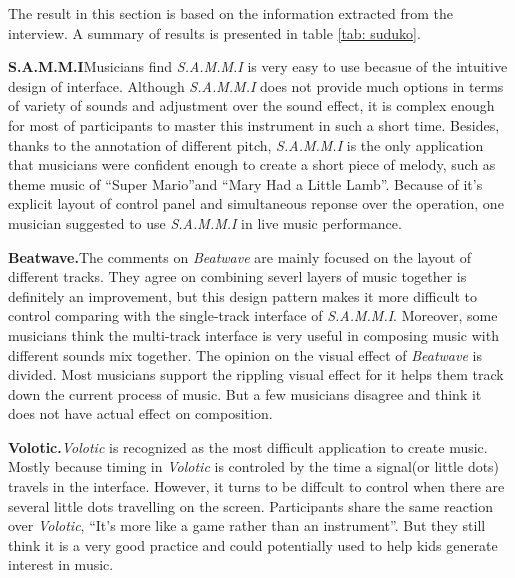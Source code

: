 The result in this section is based on the information extracted from the interview. A summary of results is presented in table \ref{tab: suduko}.

\textbf{S.A.M.M.I}\qquad Musicians find \textit{S.A.M.M.I} is very easy to use becasue of the intuitive design of interface. Although \textit{S.A.M.M.I} does not provide much options in terms of variety of sounds and adjustment over the sound effect, it is complex enough for most of participants to master this instrument in such a short time. Besides, thanks to the annotation of different pitch, \textit{S.A.M.M.I} is the only application that musicians were confident enough to create a short piece of melody, such as theme music of \textquotedblleft{Super Mario}\textquotedblright and \textquotedblleft{Mary Had a Little Lamb}\textquotedblright. Because of it's explicit layout of control panel and simultaneous reponse over the operation, one musician suggested to use \textit{S.A.M.M.I} in live music performance.

\textbf{Beatwave.}\qquad The comments on \textit{Beatwave} are mainly focused on the layout of different tracks. They agree on combining severl layers of music together is definitely an improvement, but this design pattern makes it more difficult to control comparing with the single-track interface of \textit{S.A.M.M.I}. Moreover, some musicians think the multi-track interface is very useful in composing music with different sounds mix together. The opinion on the visual effect of \textit{Beatwave} is divided. Most musicians support the rippling visual effect for it helps them track down the current process of music. But a few musicians disagree and think it does not have actual effect on composition.

\textbf{Volotic.}\qquad \textit{Volotic} is recognized as the most difficult application to create music. Mostly because timing in \textit{Volotic} is controled by the time a signal(or little dots) travels in the interface. However, it turns to be diffcult to control when there are several little dots travelling on the screen. Participants share the same reaction  over \textit{Volotic}, \textquotedblleft{It's more like a game rather than an instrument}\textquotedblright. But they still think it is a very good practice and could potentially used to help kids generate interest in music.

